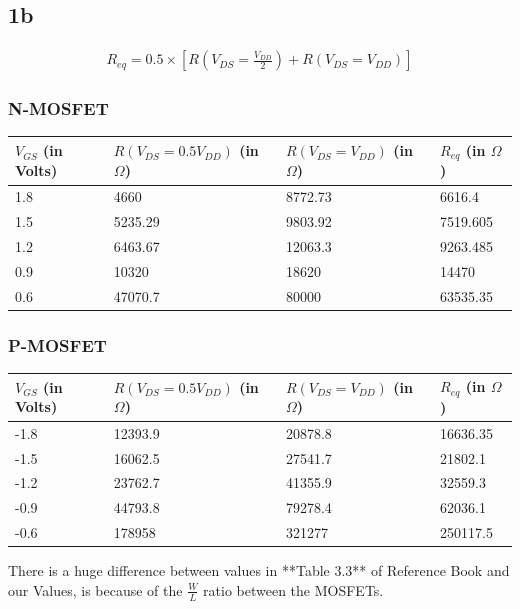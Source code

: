 \documentclass{article}
\begin{document}
\subsection{1b}
\begin{align}
    R_{eq} = 0.5\times\left[R(V_{DS} = \frac{V_{DD}}{2}) + R(V_{DS} = V_{DD})\right]
\end{align}
\subsubsection{N-MOSFET}
\begin{center}
    \begin{tabular}{ |p{3cm}|p{4cm}|p{4cm}|p{3cm}| } 
    \hline
    $V_{GS}$ (in Volts) & $R\left(V_{DS} = 0.5V_{DD}\right)$ (in $\Omega$) & $R\left(V_{DS} = V_{DD}\right)$ (in $\Omega$) & $R_{eq}$ (in $\Omega$)\\ 
    \hline
    \hline
    1.8 & 4660 & 8772.73 & 6616.4\\
    \hline
    1.5 & 5235.29 & 9803.92 & 7519.605\\
    \hline
    1.2 & 6463.67 & 12063.3 & 9263.485\\
    \hline
    0.9 & 10320 & 18620 & 14470\\
    \hline
    0.6 & 47070.7 & 80000 & 63535.35\\
    \hline
    \end{tabular}
\end{center}
\vspace{0.1in}
\subsubsection{P-MOSFET}
\begin{center}
    \begin{tabular}{ |p{3cm}|p{4cm}|p{4cm}|p{3cm}| } 
    \hline
    $V_{GS}$ (in Volts) & $R\left(V_{DS} = 0.5V_{DD}\right)$ (in $\Omega$) & $R\left(V_{DS} = V_{DD}\right)$ (in $\Omega$) & $R_{eq}$ (in $\Omega$)\\ 
    \hline
    \hline
    -1.8 & 12393.9 & 20878.8 & 16636.35\\
    \hline
    -1.5 & 16062.5 & 27541.7 & 21802.1\\
    \hline
    -1.2 & 23762.7 & 41355.9 & 32559.3\\
    \hline
    -0.9 & 44793.8 & 79278.4 & 62036.1\\
    \hline
    -0.6 & 178958 & 321277 & 250117.5\\
    \hline
    \end{tabular}
\end{center}
There is a huge difference between values in **Table 3.3** of Reference Book and our Values, is because of the $\frac{W}{L}$ ratio between the MOSFETs. 
\pagebreak
\end{document}
